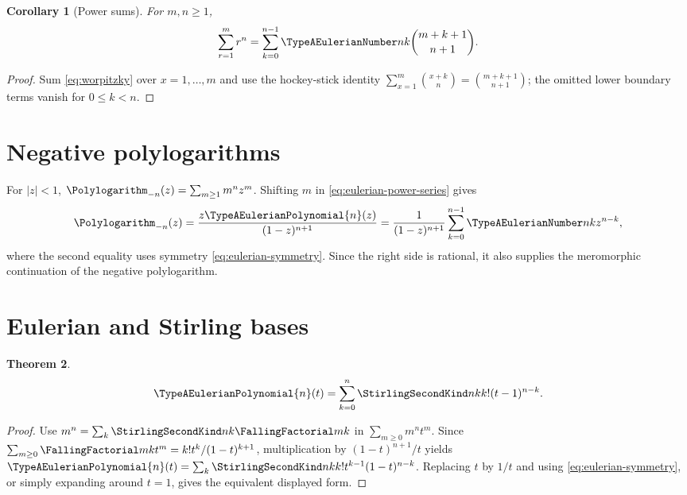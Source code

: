 \documentclass[11pt,a4paper,oneside,openany]{book}
\newtheorem{theorem}{Theorem}[chapter]
\newtheorem{corollary}[theorem]{Corollary}
\theoremstyle{definition}
\theoremstyle{remark}
\begin{document}
\begin{corollary}[Power sums]\label{cor:eulerian-power-sum}
For $m,n\ge1$,
\begin{equation}\label{eq:eulerian-power-sum}
 \sum_{r=1}^{m}r^n
 =\sum_{k=0}^{n-1}\TypeAEulerianNumber nk\binom{m+k+1}{n+1}.
\end{equation}
\end{corollary}
\begin{proof}
Sum \eqref{eq:worpitzky} over $x=1,\ldots,m$ and use the hockey-stick identity
$\sum_{x=1}^{m}\binom{x+k}{n}=\binom{m+k+1}{n+1}$; the omitted lower boundary
terms vanish for $0\le k<n$.
\end{proof}

\section{Negative polylogarithms}
For $|z|<1$, $\Polylogarithm_{-n}(z)=\sum_{m\ge1}m^nz^m$.  Shifting $m$ in
\eqref{eq:eulerian-power-series} gives
\begin{equation}\label{eq:negative-polylog-eulerian}
 \Polylogarithm_{-n}(z)=\frac{z\TypeAEulerianPolynomial{n}(z)}{(1-z)^{n+1}}
 =\frac{1}{(1-z)^{n+1}}
   \sum_{k=0}^{n-1}\TypeAEulerianNumber nk z^{n-k},
\end{equation}
where the second equality uses symmetry \eqref{eq:eulerian-symmetry}.  Since the
right side is rational, it also supplies the meromorphic continuation of the
negative polylogarithm.

\section{Eulerian and Stirling bases}
\begin{theorem}\label{thm:eulerian-stirling}
\begin{equation}\label{eq:eulerian-stirling}
 \TypeAEulerianPolynomial{n}(t)=\sum_{k=0}^{n}\StirlingSecondKind nk k!(t-1)^{n-k}.
\end{equation}
\end{theorem}
\begin{proof}
Use $m^n=\sum_k\StirlingSecondKind nk\FallingFactorial mk$ in
$\sum_{m\ge0}m^nt^m$.  Since
$\sum_{m\ge0}\FallingFactorial mk t^m=k!t^k/(1-t)^{k+1}$, multiplication by
$(1-t)^{n+1}/t$ yields
$\TypeAEulerianPolynomial{n}(t)=\sum_k\StirlingSecondKind nk k!t^{k-1}(1-t)^{n-k}$.  Replacing $t$ by $1/t$ and
using \eqref{eq:eulerian-symmetry}, or simply expanding around $t=1$, gives the
equivalent displayed form.
\end{proof}
\end{document}
